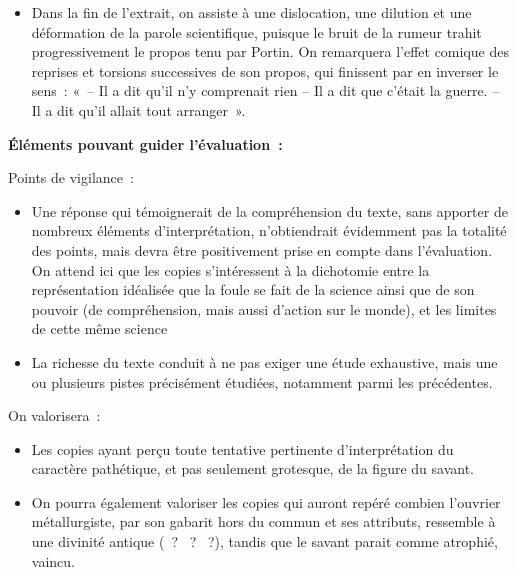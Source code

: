 {\begin{itemize}
L'apparition du savant est grotesque~: il peine à se déplacer, il «~trembl[e]~», sa voix
est désagréable («~aigrelette~»). Le fait qu'elle «~ne port[e] pas à plus de dix mètres~»,
d'ailleurs, ne traduit-il pas l'aporie du discours scientifique dans l'extrait~?
\item Dans la fin de l'extrait, on assiste à une dislocation, une dilution et une déformation
de la parole scientifique, puisque le bruit de la rumeur trahit progressivement le propos
tenu par Portin. On remarquera l'effet comique des reprises et torsions successives
de son propos, qui finissent par en inverser le sens~: «~– Il a dit qu'il n'y comprenait
rien – Il a dit que c'était la guerre. – Il a dit qu'il allait tout arranger~».
\end{itemize}

\textbf{Éléments pouvant guider l'évaluation~:}

Points de vigilance~:

\begin{itemize}
\item Une réponse qui témoignerait de la compréhension du texte, sans apporter de
nombreux éléments d'interprétation, n'obtiendrait évidemment pas la totalité
des points, mais devra être positivement prise en compte dans l'évaluation. On
attend ici que les copies s'intéressent à la dichotomie entre la représentation
idéalisée que la foule se fait de la science ainsi que de son pouvoir (de
compréhension, mais aussi d'action sur le monde), et les limites de cette même
science
\item La richesse du texte conduit à ne pas exiger une étude exhaustive, mais une
ou plusieurs pistes précisément étudiées, notamment parmi les précédentes.
\end{itemize}

On valorisera~:

\begin{itemize}
\item Les copies ayant perçu toute tentative pertinente d'interprétation du caractère
pathétique, et pas seulement grotesque, de la figure du savant.
\item On pourra également valoriser les copies qui auront repéré combien l'ouvrier
métallurgiste, par son gabarit hors du commun et ses attributs, ressemble à une
divinité antique (~? ~? ~?), tandis que le savant
parait comme atrophié, vaincu.
\end{itemize}}%
